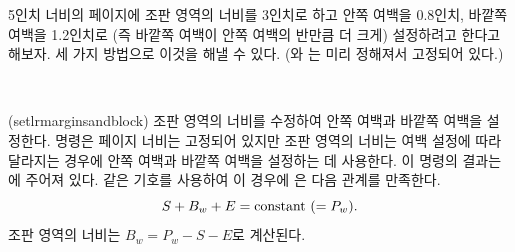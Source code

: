 5인치 너비의 페이지에 조판 영역의 너비를 3인치로 하고 안쪽 여백을 0.8인치, 바깥쪽 여백을 1.2인치로 (즉 바깥쪽 여백이 안쪽 여백의 반만큼 더 크게)
설정하려고 한다고 해보자. 세 가지 방법으로 이것을 해낼 수 있다. (\cmd{\paperwidth}와 \lnc{\textwidth}는 미리 정해져서 고정되어 있다.)
\begin{lcode}
    \setlrmargins{0.8in}{*}{*}   
    \setlrmargins{*}{1.2in}{*}   
\end{lcode}

\begin{syntax}
\cmd{\setlrmarginsandblock}\\
\end{syntax}
\glossary(setlrmarginsandblock)%
  {}%
  {조판 영역의 너비를 수정하여 안쪽 여백과 바깥쪽 여백을 설정한다.}
\cmd{\setlrmarginsandblock} 명령은 페이지 너비는 고정되어 있지만 
조판 영역의 너비는 여백 설정에 따라 달라지는 경우에 안쪽 여백과 바깥쪽 여백을
설정하는 데 사용한다.
이 명령의 결과는 에 주어져 있다. 같은 기호를 사용하여
이 경우에 \cmd{\setlrmarginsandblock}은 다음 관계를 만족한다.
\begin{displaymath}
S + B_{w} + E = \textrm{constant} \mbox{\space} (= P_{w}).
\end{displaymath}
조판 영역의 너비는 $B_w = P_w - S - E$로 계산된다.


